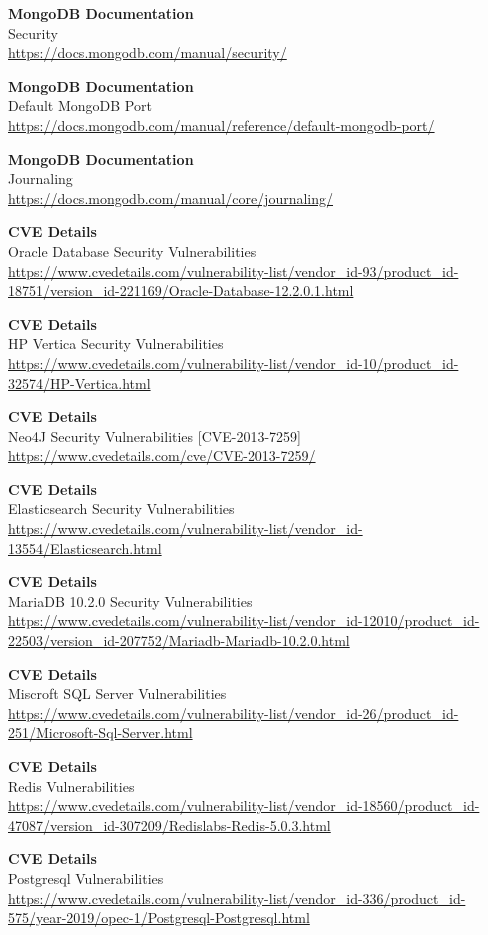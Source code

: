 \documentclass[10pt,a4paper]{article}
\begin{document}
\begin{thebibliography}{9}
	\textbf{MongoDB Documentation}\\
	Security\\
	\url{https://docs.mongodb.com/manual/security/}

	\textbf{MongoDB Documentation}\\
	Default MongoDB Port\\
	\url{https://docs.mongodb.com/manual/reference/default-mongodb-port/}

	\textbf{MongoDB Documentation}\\
	Journaling\\
	\url{https://docs.mongodb.com/manual/core/journaling/}

	\textbf{CVE Details}\\
	Oracle Database Security Vulnerabilities\\
	\url{https://www.cvedetails.com/vulnerability-list/vendor_id-93/product_id-18751/version_id-221169/Oracle-Database-12.2.0.1.html}

	\textbf{CVE Details}\\
	HP Vertica Security Vulnerabilities\\
	\url{https://www.cvedetails.com/vulnerability-list/vendor_id-10/product_id-32574/HP-Vertica.html}

	\textbf{CVE Details}\\
	Neo4J Security Vulnerabilities [CVE-2013-7259]\\
	\url{https://www.cvedetails.com/cve/CVE-2013-7259/}

	\textbf{CVE Details}\\
	Elasticsearch Security Vulnerabilities\\
	\url{https://www.cvedetails.com/vulnerability-list/vendor_id-13554/Elasticsearch.html}

	\textbf{CVE Details}\\
	MariaDB 10.2.0 Security Vulnerabilities\\
	\url{https://www.cvedetails.com/vulnerability-list/vendor_id-12010/product_id-22503/version_id-207752/Mariadb-Mariadb-10.2.0.html}

	\textbf{CVE Details}\\
	Miscroft SQL Server Vulnerabilities\\
	\url{https://www.cvedetails.com/vulnerability-list/vendor_id-26/product_id-251/Microsoft-Sql-Server.html}

	\textbf{CVE Details}\\
	Redis Vulnerabilities\\
	\url{https://www.cvedetails.com/vulnerability-list/vendor_id-18560/product_id-47087/version_id-307209/Redislabs-Redis-5.0.3.html}

	\textbf{CVE Details}\\
	Postgresql Vulnerabilities\\
	\url{https://www.cvedetails.com/vulnerability-list/vendor_id-336/product_id-575/year-2019/opec-1/Postgresql-Postgresql.html}

\end{thebibliography}
\end{document}
